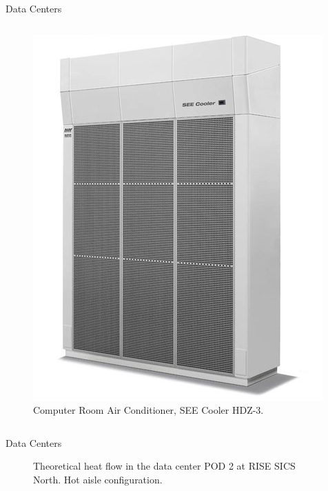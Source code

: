 \documentclass{beamer}
\begin{document}
\begin{frame}{Data Centers}
\begin{columns}[T]
\begin{column}{.5\textwidth}
\begin{figure}[ht]
\begin{center}
\includegraphics[width=0.95\linewidth]{crac.jpg}
\end{center}
\caption{Computer Room Air Conditioner, SEE Cooler HDZ-3.}
\end{figure}
\end{column}%
\end{columns}
\end{frame}

\begin{frame}{Data Centers}
\begin{figure}[!htb]
\centering
\begin{tiny} %
\def\svgwidth{0.85\linewidth}

\end{tiny}
\caption{Theoretical heat flow in the data center POD 2 at RISE SICS North. Hot aisle configuration.}
\label{fig:flow}
\end{figure}
\end{frame}
\end{document}
